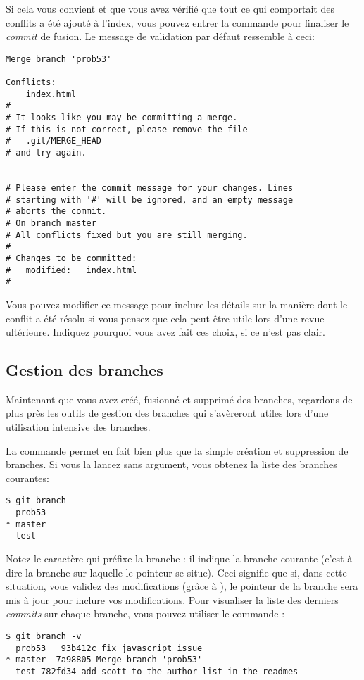 Si cela vous convient et que vous avez vérifié que tout ce qui comportait des conflits a été ajouté à l'index, vous pouvez entrer la commande  pour finaliser le \emph{commit} de fusion.
Le message de validation par défaut ressemble à ceci:
\begin{Schunk}
\begin{Verbatim}
Merge branch 'prob53'

Conflicts:
    index.html
#
# It looks like you may be committing a merge.
# If this is not correct, please remove the file
#	.git/MERGE_HEAD
# and try again.


# Please enter the commit message for your changes. Lines
# starting with '#' will be ignored, and an empty message
# aborts the commit.
# On branch master
# All conflicts fixed but you are still merging.
#
# Changes to be committed:
#	modified:   index.html
#
\end{Verbatim}
\end{Schunk}

Vous pouvez modifier ce message pour inclure les détails sur la manière dont le conflit a été résolu si vous pensez que cela peut être utile lors d'une revue ultérieure. Indiquez pourquoi vous avez fait ces choix, si ce n'est pas clair.

\subsection{Gestion des branches}
\label{sec:git:branch_management}

Maintenant que vous avez créé, fusionné et supprimé des branches, regardons de plus près les outils de gestion des branches qui s'avèreront utiles lors d'une utilisation intensive des branches.

La commande  permet en fait bien plus que la simple création et suppression de branches.
Si vous la lancez sans argument, vous obtenez la liste des branches courantes:
\begin{Schunk}
\begin{Verbatim}
$ git branch
  prob53
* master
  test
\end{Verbatim}
\end{Schunk}

Notez le caractère \code{*} qui préfixe la branche : il indique la branche courante (c'est-à-dire la branche sur laquelle le pointeur  se situe).
Ceci signifie que si, dans cette situation, vous validez des modifications (grâce à ), le pointeur de la branche  sera mis à jour pour inclure vos modifications.
Pour visualiser la liste des derniers \emph{commits} sur chaque branche, vous pouvez utiliser le commande :
\begin{Schunk}
\begin{Verbatim}
$ git branch -v
  prob53   93b412c fix javascript issue
* master  7a98805 Merge branch 'prob53'
  test 782fd34 add scott to the author list in the readmes
\end{Verbatim}
\end{Schunk}

